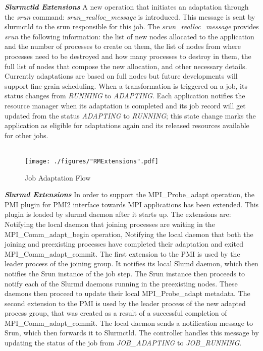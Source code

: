 \textbf{\textit{Slurmctld Extensions}} A new operation that initiates an adaptation through the \textit{srun} command: \textit{srun{\_}realloc{\_}message} is introduced. This message is sent by slurmctld to the srun responsible for this job. The \textit{srun{\_}realloc{\_}message} provides \textit{srun} the following information: the list of new nodes allocated to the application and the number of processes to create on them, the list of nodes from where processes need to be destroyed and how many processes to destroy in them, the full list of nodes that compose the new allocation, and other necessary details. Currently adaptations are based on full nodes but future developments will support fine grain scheduling. When a transformation is triggered on a job, its status changes from \textit{RUNNING} to \textit{ADAPTING}. Each application notifies the resource manager when its adaptation is completed and its job record will get updated from the status \textit{ADAPTING} to \textit{RUNNING}; this state change marks the application as eligible for adaptations again and its released resources available for other jobs.\\ \\
\begin{figure}[t]
\vspace{-0.60cm}
\texttt{[image: ./figures/"RMExtensions".pdf]}
\caption{Job Adaptation Flow}
\label{fig:1}
\end{figure}
\textbf{\textit{Slurmd Extensions}} In order to support the MPI{\_}Probe{\_}adapt operation, the PMI plugin for PMI2 interface towards MPI applications has been extended. This plugin is loaded by slurmd daemon after it starts up. The extensions are: Notifying the local daemon that joining processes are waiting in the MPI{\_}Comm{\_}adapt{\_}begin operation, Notifying the local daemon that both the joining and preexisting processes have completed their adaptation and exited MPI{\_}Comm{\_}adapt{\_}commit. The first extension to the PMI is used by the leader process of the joining group. It notifies its local Slumd daemon, which then notifies the Srun instance of the job step. The Srun instance then proceeds to notify each of the Slurmd daemons running in the preexisting nodes. These daemons then proceed to update their local MPI{\_}Probe{\_}adapt metadata. The second extension to the PMI is used by the leader process of the new adapted process group, that was created as a result of a successful completion of MPI{\_}Comm{\_}adapt{\_}commit. The local daemon sends a notification message to Srun, which then forwards it to Slurmctld. The controller handles this message by updating the status of the job from \textit{JOB{\_}ADAPTING} to \textit{JOB{\_}RUNNING}.\\ \\
